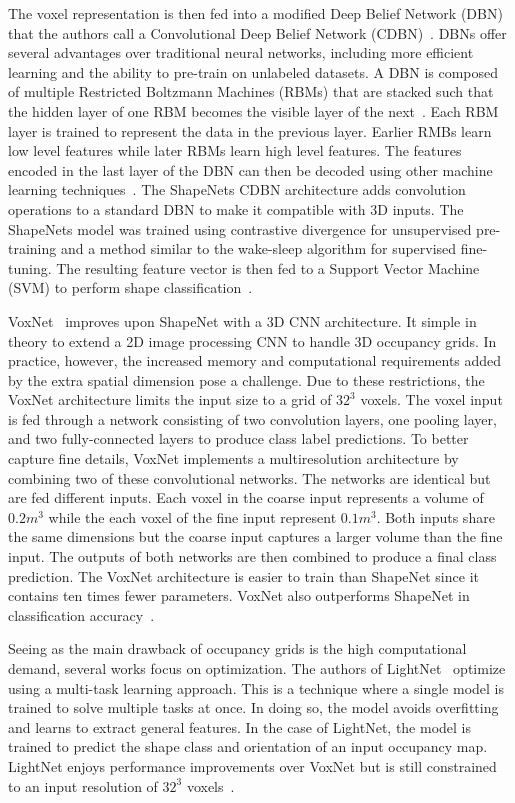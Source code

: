 The voxel representation is then fed into a modified Deep Belief Network (DBN) that the authors call a Convolutional Deep Belief Network (CDBN)~\cite{Wu2015}. DBNs offer several advantages over traditional neural networks, including more efficient learning and the ability to pre-train on unlabeled datasets. A DBN is composed of multiple Restricted Boltzmann Machines (RBMs) that are stacked such that the hidden layer of one RBM becomes the visible layer of the next~\cite{Aljabery2020}. Each RBM layer is trained to represent the data in the previous layer. Earlier RMBs learn low level features while later RBMs learn high level features. The features encoded in the last layer of the DBN can then be decoded using other machine learning techniques~\cite{McAfee2008}. The ShapeNets CDBN architecture adds convolution operations to a standard DBN to make it compatible with 3D inputs. The ShapeNets model was trained using contrastive divergence for unsupervised pre-training and a method similar to the wake-sleep algorithm for supervised fine-tuning. The resulting feature vector is then fed to a Support Vector Machine (SVM) to perform shape classification~\cite{Wu2015}.

VoxNet~\cite{Maturana2015} improves upon ShapeNet with a 3D CNN architecture. It simple in theory to extend a 2D image processing CNN to handle 3D occupancy grids. In practice, however, the increased memory and computational requirements added by the extra spatial dimension pose a challenge. Due to these restrictions, the VoxNet architecture limits the input size to a grid of $32^3$ voxels. The voxel input is fed through a network consisting of two convolution layers, one pooling layer, and two fully-connected layers to produce class label predictions. To better capture fine details, VoxNet implements a multiresolution architecture by combining two of these convolutional networks. The networks are identical but are fed different inputs. Each voxel in the coarse input represents a volume of $0.2m^3$ while the each voxel of the fine input represent $0.1m^3$. Both inputs share the same dimensions but the coarse input captures a larger volume than the fine input. The outputs of both networks are then combined to produce a final class prediction. The VoxNet architecture is easier to train than ShapeNet since it contains ten times fewer parameters. VoxNet also outperforms ShapeNet in classification accuracy~\cite{Maturana2015}.

Seeing as the main drawback of occupancy grids is the high computational demand, several works focus on optimization. The authors of LightNet~\cite{Ye2016} optimize using a multi-task learning approach. This is a technique where a single model is trained to solve multiple tasks at once. In doing so, the model avoids overfitting and learns to extract general features. In the case of LightNet, the model is trained to predict the shape class and orientation of an input occupancy map. LightNet enjoys performance improvements over VoxNet but is still constrained to an input resolution of $32^3$ voxels~\cite{Ye2016}. 

